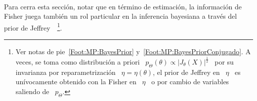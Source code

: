 \

Para cerra esta secci\'on, notar que en t\'ermino de estimaci\'on,
la informaci\'on  de Fisher
juega tambi\'en  un rol  particular en  la inferencia  bayesiana a  trav\'es del
prior  de Jeffrey~\cite{Jef46,  Jef48,  LehCas98,  Rob07}~\footnote{
Ver notas de pie~\ref{Foot:MP:BayesPrior}
  y~\ref{Foot:MP:BayesPriorConjugado}.   A  veces, se  toma  como  distribuci\'on a  priori  \
$p_\Theta(\theta)  \propto  |J_\theta(X)|^\frac12$  \   por  su  invarianza  por
reparametrizaci\'on  \ $\eta  =  \eta(\theta)$, \ie  el prior  de  Jeffrey en  \
$\eta$ \ es un\'ivocamente obtenido con la Fisher  en \ $\eta$ \ o por cambio de
variables saliendo de \ $p_\Theta$.}. \SZ{Dejar ac\'a?}




\label{Ssec:SZ:FisherCurvatura}


